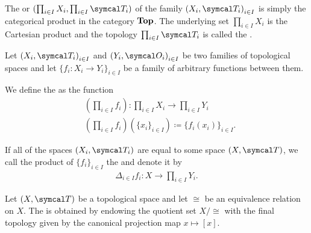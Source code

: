 \begin{definition}\label{def:topological_product}
  The  or  $(\prod_{i \in I} X_i, \prod_{i \in I} \Cal{T}_i)$ of the family ${ (X_i, \Cal{T}_i) }_{i \in I}$ is simply the categorical product in the category $\operatorname{\mathbf{Top}}$. The underlying set $\prod_{i \in I} X_i$ is the Cartesian product and the topology $\prod_{i \in I} \Cal{T}_i$ is called the .

  Let ${ (X_i, \Cal{T}_i) }_{i \in I}$ and ${ (Y_i, \Cal{O}_i) }_{i \in I}$ be two families of topological spaces and let $\{ f_i: X_i \to Y_i \}_{i \in I}$ be a family of arbitrary functions between them.

  We define the  as the function
  \begin{align*}
    &\left(\prod_{i \in I} f_i \right): \prod_{i \in I} X_i \to \prod_{i \in I} Y_i \\
    &\left(\prod_{i \in I} f_i \right)(\{ x_i \}_{i \in I}) \coloneqq \{ f_i (x_i) \}_{i \in I}.
  \end{align*}

  If all of the spaces $(X_i, \Cal{T}_i)$ are equal to some space $(X, \Cal{T})$, we call the product of $\{ f_i \}_{i \in I}$ the  and denote it by
  \begin{align*}
    \Delta_{i \in I} f_i: X \to \prod_{i \in I} Y_i.
  \end{align*}
\end{definition}

\begin{definition}\label{def:topological_quotient}\cite[90]{Engelking1989}
  Let $(X, \Cal{T})$ be a topological space and let $\cong$ be an equivalence relation on $X$. The  is obtained by endowing the quotient set $X / \cong$ with the final topology given by the canonical projection map $x \mapsto [x]$.
\end{definition}

